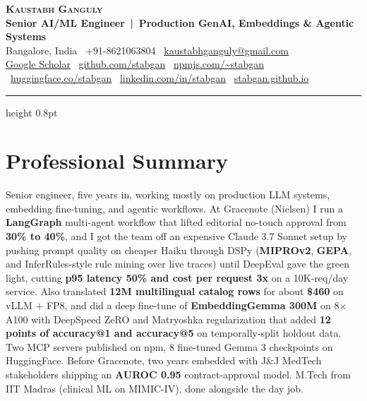 \documentclass[letterpaper,11pt]{article}
\begin{document}
\begin{flushleft}
  \textbf{\Huge \scshape \color{accent}Kaustabh Ganguly}\\[0.25em]
  \normalsize \textbf{Senior AI/ML Engineer \,|\, Production GenAI, Embeddings \& Agentic Systems}\\[0.3em]
  \small Bangalore, India \textbar\ +91-8621063804 \textbar\ \href{mailto:kaustabhganguly@gmail.com}{kaustabhganguly@gmail.com}\\[0.15em]
  \footnotesize \href{https://scholar.google.com/citations?user=3AG6T5QAAAAJ}{Google Scholar} \textbar\ \href{https://github.com/stabgan}{github.com/stabgan} \textbar\ \href{https://www.npmjs.com/~stabgan}{npmjs.com/\textasciitilde stabgan} \textbar\ \href{https://huggingface.co/stabgan}{huggingface.co/stabgan} \textbar\ \href{https://linkedin.com/in/stabgan}{linkedin.com/in/stabgan} \textbar\ \href{https://stabgan.github.io}{stabgan.github.io}
\end{flushleft}
\vspace{-2pt}
{\color{accent}\hrule height 0.8pt}
\vspace{-4pt}

\section{Professional Summary}
\small
Senior engineer, five years in, working mostly on production LLM systems, embedding fine-tuning, and agentic workflows. At Gracenote (Nielsen) I run a \textbf{LangGraph} multi-agent workflow that lifted editorial no-touch approval from \textbf{30\% to 40\%}, and I got the team off an expensive Claude 3.7 Sonnet setup by pushing prompt quality on cheaper Haiku through DSPy (\textbf{MIPROv2}, \textbf{GEPA}, and InferRules-style rule mining over live traces) until DeepEval gave the green light, cutting \textbf{p95 latency 50\% and cost per request 3x} on a 10K-req/day service. Also translated \textbf{12M multilingual catalog rows} for about \textbf{\$460} on vLLM + FP8, and did a deep fine-tune of \textbf{EmbeddingGemma 300M} on 8$\times$ A100 with DeepSpeed ZeRO and Matryoshka regularization that added \textbf{12 points of accuracy@1 and accuracy@5} on temporally-split holdout data. Two MCP servers published on npm, 8 fine-tuned Gemma 3 checkpoints on HuggingFace. Before Gracenote, two years embedded with J\&J MedTech stakeholders shipping an \textbf{AUROC 0.95} contract-approval model. M.Tech from IIT Madras (clinical ML on MIMIC-IV), done alongside the day job.
\end{document}
